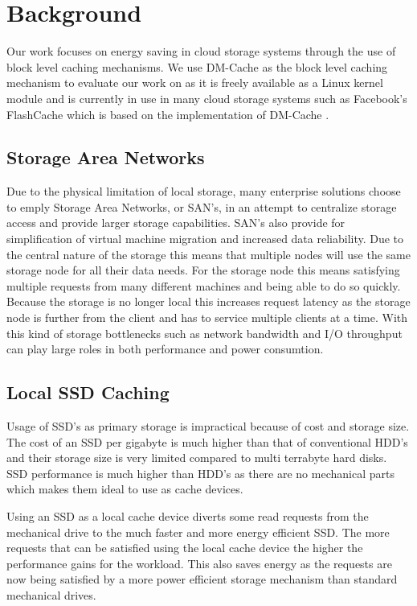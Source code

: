 \section{Background}

Our work focuses on energy saving in cloud storage systems through the use of
block level caching mechanisms. We use DM-Cache as the block level caching
mechanism to evaluate our work on as it is freely available as a Linux kernel
module and is currently in use in many cloud storage systems such as Facebook's
FlashCache which is based on the implementation of DM-Cache \cite{flashcache}.

\subsection{Storage Area Networks}

Due to the physical limitation of local storage, many enterprise solutions
choose to emply Storage Area Networks, or SAN's, in an attempt to centralize
storage access and provide larger storage capabilities. SAN's also provide for
simplification of virtual machine migration and increased data reliability. Due
to the central nature of the storage this means that multiple nodes will use the
same storage node for all their data needs. For the storage node this means
satisfying multiple requests from many different machines and being able to do
so quickly. Because the storage is no longer local this increases request
latency as the storage node is further from the client and has to service
multiple clients at a time. With this kind of storage bottlenecks such as
network bandwidth and I/O throughput can play large roles in both performance
and power consumtion.

\subsection{Local SSD Caching}

Usage of SSD's as primary storage is impractical because of cost and storage
size. The cost of an SSD per gigabyte is much higher than that of conventional
HDD's and their storage size is very limited compared to multi terrabyte hard
disks. SSD performance is much higher than HDD's as there are no mechanical
parts which makes them ideal to use as cache devices.

Using an SSD as a local cache device diverts some read requests from the
mechanical drive to the much faster and more energy efficient SSD. The more
requests that can be satisfied using the local cache device the higher the
performance gains for the workload. This also saves energy as the requests are
now being satisfied by a more power efficient storage mechanism than standard
mechanical drives.

